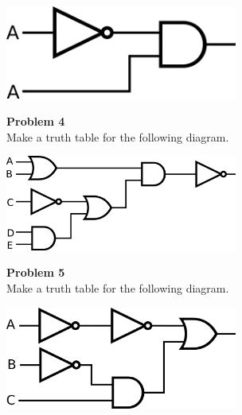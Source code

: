 \documentclass[11pt]{report}
\begin{document}
\begin{center}
    \begin{minipage}{\linewidth}
        \includegraphics[width=3in]{images/nautology.png}
    \end{minipage}
\end{center}
\vspace{2in}
\begin{center}
    \textbf{Problem 4}\\
    Make a truth table for the following diagram.
    \vspace{.8in}
\end{center}
\begin{center}
    \begin{minipage}{\linewidth}
        \includegraphics[width=3in]{images/complicated_1.png}
    \end{minipage}
\end{center}
\vspace{3in}
\begin{center}
    \textbf{Problem 5}\\
    Make a truth table for the following diagram.
    \vspace{.8in}
\end{center}
\begin{center}
    \begin{minipage}{\linewidth}
        \includegraphics[width=3in]{images/complicated_2.png}
    \end{minipage}
\end{center}
\end{document}
